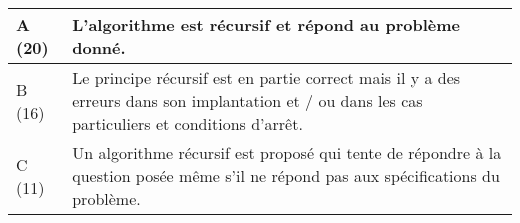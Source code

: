 \documentclass{../cours}
\begin{document}
\begin{tabular}{|l|p{12cm}|}
\hline
A (20) & \small{L’algorithme est récursif et répond au problème donné.} \\ \hline
B (16) &\small{Le principe récursif est en partie correct mais il y a des erreurs dans son implantation et / ou dans les cas particuliers et conditions d'arrêt. } \\ \hline
C (11) & \small{Un algorithme récursif est proposé qui tente de répondre à la question posée même s'il ne répond pas aux spécifications du problème.}\\ \hline
\end{tabular}








\end{document}
